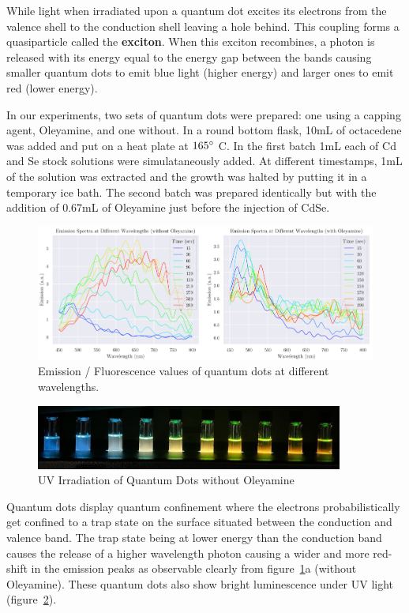 \documentclass[journal=jacsat,manuscript=article]{achemso}
\begin{document}
While light when irradiated upon a quantum dot excites its electrons from the valence shell to the conduction shell leaving a hole behind. This coupling forms a quasiparticle called the \textbf{exciton}. When this exciton recombines, a photon is released with its energy equal to the energy gap between the bands causing smaller quantum dots to emit blue light (higher energy) and larger ones to emit red (lower energy).

In our experiments, two sets of quantum dots were prepared: one using a capping agent, Oleyamine, and one without. In a round bottom flask, 10mL of octacedene was added and put on a heat plate at $165 \degree$ C. In the first batch 1mL each of Cd and Se stock solutions were simulataneously added. At different timestamps, 1mL of the solution was extracted and the growth was halted by putting it in a temporary ice bath. The second batch was prepared identically but with the addition of 0.67mL of Oleyamine just before the injection of CdSe.

\begin{figure}[h!]
  \centering
  \includegraphics[width=1\textwidth]{data/qds/combined.png}
  \caption{Emission / Fluorescence values of quantum dots at different wavelengths.}\label{fig1}
\end{figure}

\begin{figure}[h!]
  \centering
  \includegraphics[width=0.9\textwidth]{data/qds/w_o_oleyamine_uv_pic.jpeg}
  \caption{UV Irradiation of Quantum Dots without Oleyamine}\label{fig2}
\end{figure}

Quantum dots display quantum confinement where the electrons probabilistically get confined to a trap state on the surface situated between the conduction and valence band\cite{Landry_Morrell_Karagounis_Hsia_Wang_2013}. The trap state being at lower energy than the conduction band causes the release of a higher wavelength photon causing a wider and more red-shift in the emission peaks as observable clearly from figure~\ref{fig1}a (without Oleyamine). These quantum dots also show bright luminescence under UV light (figure~\ref{fig2}).
\end{document}
